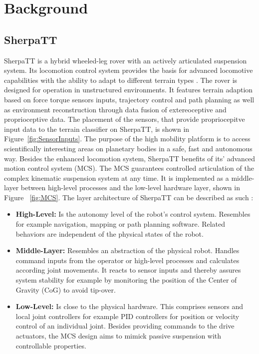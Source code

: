 \documentclass{article}
\begin{document}

\section{Background}


\subsection{SherpaTT}

SherpaTT is a hybrid wheeled-leg rover with an actively articulated suspension system. Its locomotion control system provides the basis for advanced locomotive capabilities with the ability to adapt to different terrain types \cite{cordes2018}. The rover is designed for operation in unstructured environments. It features terrain adaption based on force torque sensors inputs, trajectory control and path planning as well as environment reconstruction through data fusion of extereoceptive and proprioceptive data. The placement of the sensors, that provide propriocepitve input data to the terrain classifier on SherpaTT, is shown in Figure~\ref{fig:SensorInputs}. The purpose of the high mobility platform is to access scientifically interesting areas on planetary bodies in a safe, fast and autonomous way. Besides the enhanced locomotion system, SherpaTT benefits of its’ advanced motion control system (MCS). The MCS guarantees controlled articulation of the complex kinematic suspension system at any time. It is implemented as a middle-layer between high-level processes and the low-level hardware layer, shown in Figure ~\ref{fig:MCS}. The layer architecture of SherpaTT can be described as such \cite{cordes2018}:

\begin{itemize}
    \item \textbf{High-Level:} Is the autonomy level of the robot’s control system. Resembles for example navigation, mapping or path planning software. Related behaviors are independent of the physical states of the robot.
    \item \textbf{Middle-Layer:} Resembles an abstraction of the physical robot. Handles command inputs from the operator or high-level processes and calculates according joint movements. It reacts to sensor inputs and thereby assures system stability for example by monitoring the position of the Center of Gravity (CoG) to avoid tip-over.
    \item \textbf{Low-Level:} Is close to the physical hardware. This comprises sensors and local joint controllers for example PID controllers for position or velocity control of an individual joint. Besides providing commands to the drive actuators, the MCS design aims to mimick passive suspension with controllable properties.
\end{itemize}
\end{document}
